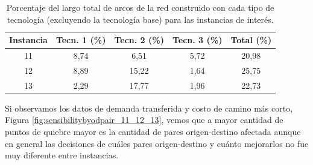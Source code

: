  \begin{table}[h!]
  \centering
  \begin{tabular}{ccccc}
    \toprule
      Instancia & Tecn. 1 (\%) & Tecn. 2 (\%) & Tecn. 3 (\%) & Total (\%) \\
    \midrule
      11 & 8,74  & 6,51   & 5,72 & 20,98 \\
      12 & 8,89  & 15,22  & 1,64 & 25,75 \\
      13 & 2,29  & 17,77  & 1,96 & 22,73 \\
    \bottomrule
  \end{tabular}
  \caption{Porcentaje del largo total de arcos de la red construido con cada tipo de tecnología (excluyendo la tecnología base) para las instancias de interés.}\label{table:sensibilityinfralengths}
\end{table}

Si observamos los datos de demanda transferida y costo de camino más corto, Figura \ref{fig:sensibilitybyodpair_11_12_13}, vemos que a mayor cantidad de puntos de quiebre mayor es la cantidad de pares origen-destino afectada aunque en general las decisiones de cuáles pares origen-destino y cuánto mejorarlos no fue muy diferente entre instancias.

